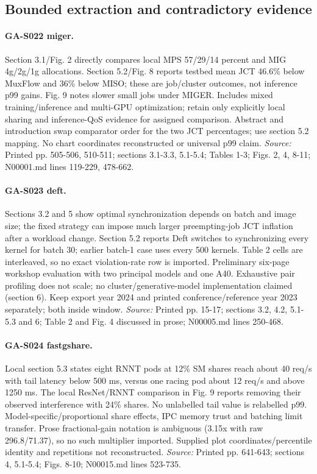 \subsection{Bounded extraction and contradictory evidence}

\paragraph{GA-S022 miger.} Section 3.1/Fig. 2 directly compares local MPS 57/29/14 percent and MIG 4g/2g/1g allocations. Section 5.2/Fig. 8 reports testbed mean JCT 46.6\% below MuxFlow and 36\% below MISO; these are job/cluster outcomes, not inference p99 gains. Fig. 9 notes slower small jobs under MIGER. Includes mixed training/inference and multi-GPU optimization; retain only explicitly local sharing and inference-QoS evidence for assigned comparison. Abstract and introduction swap comparator order for the two JCT percentages; use section 5.2 mapping. No chart coordinates reconstructed or universal p99 claim. \textit{Source:} Printed pp. 505-506, 510-511; sections 3.1-3.3, 5.1-5.4; Tables 1-3; Figs. 2, 4, 8-11; N00001.md lines 119-229, 478-662.

\paragraph{GA-S023 deft.} Sections 3.2 and 5 show optimal synchronization depends on batch and image size; the fixed strategy can impose much larger preempting-job JCT inflation after a workload change. Section 5.2 reports Deft switches to synchronizing every kernel for batch 30; earlier batch-1 case uses every 500 kernels. Table 2 cells are interleaved, so no exact violation-rate row is imported. Preliminary six-page workshop evaluation with two principal models and one A40. Exhaustive pair profiling does not scale; no cluster/generative-model implementation claimed (section 6). Keep export year 2024 and printed conference/reference year 2023 separately; both inside window. \textit{Source:} Printed pp. 15-17; sections 3.2, 4.2, 5.1-5.3 and 6; Table 2 and Fig. 4 discussed in prose; N00005.md lines 250-468.

\paragraph{GA-S024 fastgshare.} Local section 5.3 states eight RNNT pods at 12\% SM shares reach about 40 req/s with tail latency below 500 ms, versus one racing pod about 12 req/s and above 1250 ms. The local ResNet/RNNT comparison in Fig. 9 reports removing their observed interference with 24\% shares. No unlabelled tail value is relabelled p99. Model-specific/proportional share effects, IPC memory trust and batching limit transfer. Prose fractional-gain notation is ambiguous (3.15x with raw 296.8/71.37), so no such multiplier imported. Supplied plot coordinates/percentile identity and repetitions not reconstructed. \textit{Source:} Printed pp. 641-643; sections 4, 5.1-5.4; Figs. 8-10; N00015.md lines 523-735.

